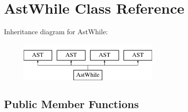 \hypertarget{classAstWhile}{\section{Ast\-While Class Reference}
\label{classAstWhile}
}
Inheritance diagram for Ast\-While\-:\begin{figure}[H]
\begin{center}
\leavevmode
\includegraphics[height=2.000000cm]{classAstWhile}
\end{center}
\end{figure}
\subsection*{Public Member Functions}
